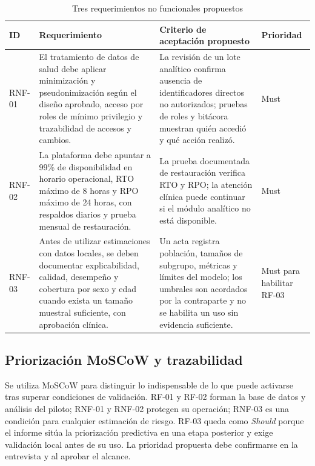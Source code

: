 \documentclass[12pt,a4paper]{article}
\begin{document}
\begin{table}[H]
  \centering
  \caption{Tres requerimientos no funcionales propuestos}
  \label{tab:act1-rnf}
  \scriptsize
  \begin{tabularx}{\textwidth}{@{}lXXl@{}}
    \toprule
    ID & Requerimiento & Criterio de aceptación propuesto & Prioridad \\
    \midrule
    RNF-01 & El tratamiento de datos de salud debe aplicar minimización y pseudonimización según el diseño aprobado, acceso por roles de mínimo privilegio y trazabilidad de accesos y cambios. & La revisión de un lote analítico confirma ausencia de identificadores directos no autorizados; pruebas de roles y bitácora muestran quién accedió y qué acción realizó. & Must \\
    RNF-02 & La plataforma debe apuntar a 99\% de disponibilidad en horario operacional, RTO máximo de 8 horas y RPO máximo de 24 horas, con respaldos diarios y prueba mensual de restauración. & La prueba documentada de restauración verifica RTO y RPO; la atención clínica puede continuar si el módulo analítico no está disponible. & Must \\
    RNF-03 & Antes de utilizar estimaciones con datos locales, se deben documentar explicabilidad, calidad, desempeño y cobertura por sexo y edad cuando exista un tamaño muestral suficiente, con aprobación clínica. & Un acta registra población, tamaños de subgrupo, métricas y límites del modelo; los umbrales son acordados por la contraparte y no se habilita un uso sin evidencia suficiente. & Must para habilitar RF-03 \\
    \bottomrule
  \end{tabularx}
\end{table}

\subsection{Priorización MoSCoW y trazabilidad}

Se utiliza MoSCoW para distinguir lo indispensable de lo que puede activarse tras superar condiciones de validación. RF-01 y RF-02 forman la base de datos y análisis del piloto; RNF-01 y RNF-02 protegen su operación; RNF-03 es una condición para cualquier estimación de riesgo. RF-03 queda como \emph{Should} porque el informe sitúa la priorización predictiva en una etapa posterior y exige validación local antes de su uso. La prioridad propuesta debe confirmarse en la entrevista y al aprobar el alcance.
\end{document}
